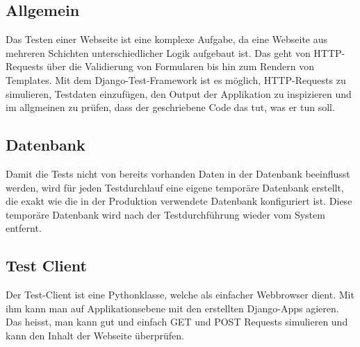 \subsection{Allgemein}
Das Testen einer Webseite ist eine komplexe Aufgabe, da eine Webseite aus mehreren Schichten unterschiedlicher Logik aufgebaut ist. Das geht von HTTP-Requests über die Validierung von Formularen bis hin zum Rendern von Templates. Mit dem Django-Test-Framework ist es möglich, HTTP-Requests zu simulieren, Testdaten einzufügen, den Output der Applikation zu inspizieren und im allgmeinen zu prüfen, dass der geschriebene Code das tut, was er tun soll.

\subsection{Datenbank}
Damit die Tests nicht von bereits vorhanden Daten in der Datenbank beeinflusst werden, wird für jeden Testdurchlauf eine eigene temporäre Datenbank erstellt, die exakt wie die in der Produktion verwendete Datenbank konfiguriert ist. Diese temporäre Datenbank wird nach der Testdurchführung wieder vom System entfernt.

\subsection{Test Client}
Der Test-Client ist eine Pythonklasse, welche als einfacher Webbrowser dient. Mit ihm kann man auf Applikationsebene mit den erstellten Django-Apps agieren. Das heisst, man kann gut und einfach GET und POST Requests simulieren und kann den Inhalt der Webseite überprüfen. 